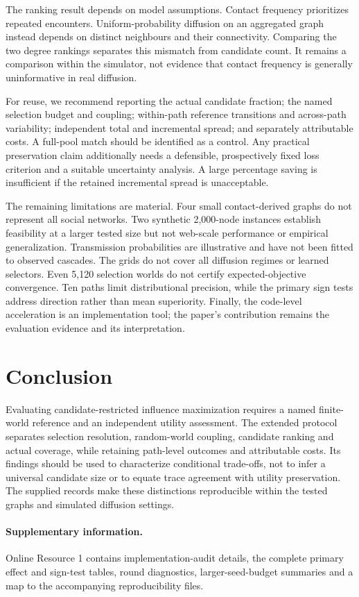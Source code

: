 \documentclass[smallextended]{svjour3}
\begin{document}
The ranking result depends on model assumptions. Contact frequency prioritizes repeated encounters. Uniform-probability diffusion on an aggregated graph instead depends on distinct neighbours and their connectivity. Comparing the two degree rankings separates this mismatch from candidate count. It remains a comparison within the simulator, not evidence that contact frequency is generally uninformative in real diffusion.

For reuse, we recommend reporting the actual candidate fraction; the named selection budget and coupling; within-path reference transitions and across-path variability; independent total and incremental spread; and separately attributable costs. A full-pool match should be identified as a control. Any practical preservation claim additionally needs a defensible, prospectively fixed loss criterion and a suitable uncertainty analysis. A large percentage saving is insufficient if the retained incremental spread is unacceptable.

The remaining limitations are material. Four small contact-derived graphs do not represent all social networks. Two synthetic 2,000-node instances establish feasibility at a larger tested size but not web-scale performance or empirical generalization. Transmission probabilities are illustrative and have not been fitted to observed cascades. The grids do not cover all diffusion regimes or learned selectors. Even 5,120 selection worlds do not certify expected-objective convergence. Ten paths limit distributional precision, while the primary sign tests address direction rather than mean superiority. Finally, the code-level acceleration is an implementation tool; the paper's contribution remains the evaluation evidence and its interpretation.

\section{Conclusion}
Evaluating candidate-restricted influence maximization requires a named finite-world reference and an independent utility assessment. The extended protocol separates selection resolution, random-world coupling, candidate ranking and actual coverage, while retaining path-level outcomes and attributable costs. Its findings should be used to characterize conditional trade-offs, not to infer a universal candidate size or to equate trace agreement with utility preservation. The supplied records make these distinctions reproducible within the tested graphs and simulated diffusion settings.
\paragraph{Supplementary information.} Online Resource 1 contains implementation-audit details, the complete primary effect and sign-test tables, round diagnostics, larger-seed-budget summaries and a map to the accompanying reproducibility files.
\end{document}
